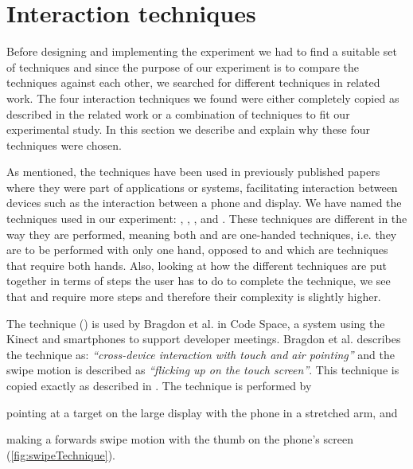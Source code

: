 \section{Interaction techniques} \label{sec:techniques}
Before designing and implementing the experiment we had to find a suitable set of techniques and since the purpose of our experiment is to compare the techniques against each other, we searched for different techniques in related work.
The four interaction techniques we found were either completely copied as described in the related work or a combination of techniques to fit our experimental study.
In this section we describe and explain why these four techniques were chosen.

As mentioned, the techniques have been used in previously published papers where they were part of applications or systems, facilitating interaction between devices such as the interaction between a phone and display. 
We have named the techniques used in our experiment: \swipe, \tilt, \throw, and \pinch.
These techniques are different in the way they are performed, meaning both \swipe and \tilt are one-handed techniques, i.e. they are to be performed with only one hand, opposed to \throw and \pinch which are techniques that require both hands.
Also, looking at how the different techniques are put together in terms of steps the user has to do to complete the technique, we see that \throw and \pinch require more steps and therefore their complexity is slightly higher.


The \swipe technique () is used by Bragdon et al. \cite{Bragdon:2011} in Code Space, a system using the Kinect and smartphones to support developer meetings. 
Bragdon et al. describes the technique as: \emph{``cross-device interaction with touch and air pointing''} and the swipe motion is described as \emph{``flicking up on the touch screen''}. 
This technique is copied exactly as described in \cite{Bragdon:2011}.
The \swipe technique is performed by 
\begin{enumerate*}[label=\itshape\roman*\upshape)]
	\item{pointing at a target on the large display with the phone in a stretched arm, and}
	\item{making a forwards swipe motion with the thumb on the phone's screen (\cref{fig:swipeTechnique}).}
\end{enumerate*}

